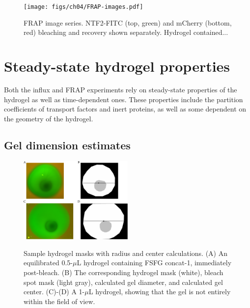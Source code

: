 \begin{figure} 
\caption{FRAP image series. NTF2-FITC (top, green) and mCherry (bottom, red) bleaching and recovery shown separately.  Hydrogel contained... }
\centering
\texttt{[image: figs/ch04/FRAP-images.pdf]}
\label{fig:frap-images}
\end{figure} 

\section{Steady-state hydrogel properties}

Both the influx and FRAP experiments rely on steady-state properties of the hydrogel as well as time-dependent ones.  These properties include the partition coefficients of transport factors and inert proteins, as well as some dependent on the geometry of the hydrogel.

\subsection{Gel dimension estimates}
\label{sec:gel-dim}

\begin{figure} 
\caption{Sample hydrogel masks with radius and center calculations.  (A) An equilibrated 0.5-$\mu$L hydrogel containing FSFG concat-1, immediately post-bleach. (B) The corresponding hydrogel mask (white), bleach spot mask (light gray), calculated gel diameter, and calculated gel center. (C)-(D) A 1-$\mu$L hydrogel, showing that the gel is not entirely within the field of view.}
\centering
\includegraphics[width=0.5\textwidth]{figs/ch04/geometry.pdf}
\label{fig:masks}
\end{figure} 

